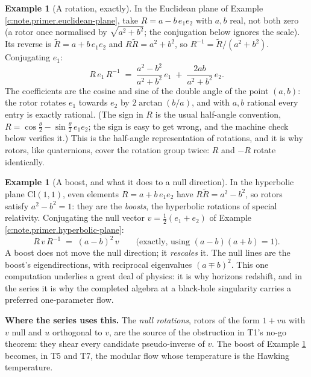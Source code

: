 \documentclass[11pt]{article}
\theoremstyle{definition}
\newtheorem{example}[theorem]{Example}
\theoremstyle{plain}
\providecommand{\Cl}{}\renewcommand{\Cl}{\mathrm{Cl}}
\begin{document}
\begin{example}[A rotation, exactly]\label{c:note.primer.rotation-exactly}
In the Euclidean plane of Example \ref{c:note.primer.euclidean-plane}, take $R = a - b\,e_1 e_2$ with $a, b$ real, not both zero (a rotor once normalised by $\sqrt{a^2 + b^2}$; the conjugation below ignores the scale). Its reverse is $\tilde{R} = a + b\, e_1 e_2$ and $R\tilde{R} = a^{2} + b^{2}$, so $R^{-1} = \tilde{R}/(a^2 + b^2)$. Conjugating $e_1$:
\[
R\, e_1\, R^{-1} \;=\; \frac{a^{2} - b^{2}}{a^{2} + b^{2}}\, e_1 \;+\; \frac{2ab}{a^{2} + b^{2}}\, e_2 .
\]
The coefficients are the cosine and sine of the double angle of the point $(a,b)$: the rotor rotates $e_1$ towards $e_2$ by $2\arctan(b/a)$, and with $a, b$ rational every entry is exactly rational. (The sign in $R$ is the usual half-angle convention, $R = \cos\tfrac{\theta}{2} - \sin\tfrac{\theta}{2}\, e_1 e_2$; the sign is easy to get wrong, and the machine check below verifies it.) This is the half-angle representation of rotations, and it is why rotors, like quaternions, cover the rotation group twice: $R$ and $-R$ rotate identically.
\end{example}

\begin{example}[A boost, and what it does to a null direction]\label{c:note.primer.boost-what-it-does-null-direction}
In the hyperbolic plane $\Cl(1,1)$, even elements $R = a + b\, e_1 e_2$ have $R\tilde R = a^2 - b^2$, so rotors satisfy $a^{2} - b^{2} = 1$: they are the \emph{boosts}, the hyperbolic rotations of special relativity. Conjugating the null vector $v = \tfrac12(e_1 + e_2)$ of Example \ref{c:note.primer.hyperbolic-plane}:
\[
R\,v\,R^{-1} \;=\; (a - b)^{2}\, v \qquad \text{(exactly, using } (a-b)(a+b) = 1\text{)}.
\]
A boost does not move the null direction; it \emph{rescales} it. The null lines are the boost's eigendirections, with reciprocal eigenvalues $(a \mp b)^{2}$. This one computation underlies a great deal of physics: it is why horizons redshift, and in the series it is why the completed algebra at a black-hole singularity carries a preferred one-parameter flow.
\end{example}

\label{c:note.primer.setting-rotors-how-algebra-moves-things-2}
\textbf{Where the series uses this.} The \emph{null rotations}, rotors of the form $1 + vu$ with $v$ null and $u$ orthogonal to $v$, are the source of the obstruction in T1's no-go theorem: they shear every candidate pseudo-inverse of $v$. The boost of Example \ref{c:note.primer.boost-what-it-does-null-direction} becomes, in T5 and T7, the modular flow whose temperature is the Hawking temperature.
\end{document}
